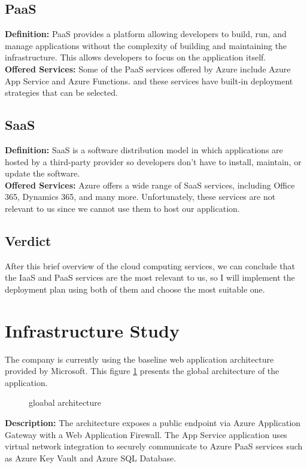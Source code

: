\subsection*{PaaS}
\noindent
\textbf{Definition:} PaaS provides a platform allowing developers to build, run, and manage applications without the complexity of building and maintaining the infrastructure. This allows developers to focus on the application itself.
\noindent \\
\textbf{Offered Services:} Some of the PaaS services offered by Azure include Azure App Service and Azure Functions. and these services have built-in deployment strategies that can be selected.
\subsection*{SaaS}
\noindent
\textbf{Definition:} SaaS is a software distribution model in which applications are hosted by a third-party provider so developers don't have to install, maintain, or update the software.
\noindent \\
\textbf{Offered Services:} Azure offers a wide range of SaaS services, including Office 365, Dynamics 365, and many more. Unfortunately, these services are not relevant to us since we cannot use them to host our application.
\subsection*{Verdict}
After this brief overview of the cloud computing services, we can conclude that the IaaS and PaaS services are the most relevant to us, so I will implement the deployment plan using both of them and choose the most suitable one.
\section{Infrastructure Study}
The company is currently using the baseline web application architecture provided by Microsoft\cite{webArticle6}.
This figure \ref{fig:gloabal_architecture} presents the global architecture of the application.

\begin{figure}[htpb]
    \centering
    \caption{gloabal architecture}
    \label{fig:gloabal_architecture}
\end{figure}

\pagebreak

\noindent \textbf{Description:} The architecture exposes a public endpoint via Azure Application Gateway with a Web Application Firewall. The App Service application uses virtual network integration to securely communicate to Azure PaaS services such as Azure Key Vault and Azure SQL Database.

